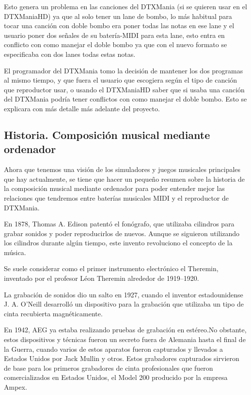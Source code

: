 \documentclass[a4paper,11pt,oneside]{book}
\begin{document}
Esto genera un problema en las canciones del DTXMania (si se quieren usar en el DTXManiaHD) ya que al solo tener un lane de bombo, lo más habitual para tocar una canción con doble bombo era poner todas las notas en ese lane y el usuario poner dos señales de su batería-MIDI para esta lane, esto entra en conflicto con como manejar el doble bombo ya que con el nuevo formato se especificaba con dos lanes todas estas notas.

El programador del DTXMania tomo la decisión de mantener los dos programas al mismo tiempo, y que fuera el usuario que escogiera según el tipo de canción que reproductor usar, o usando el DTXManiaHD saber que si usaba una canción del DTXMania podría tener conflictos con como manejar el doble bombo. Esto se explicara con más detalle más adelante del proyecto.

\subsection{Historia. Composición musical mediante ordenador}
Ahora que tenemos una visión de los simuladores y juegos musicales principales que hay actualmente, se tiene que hacer un pequeño resumen sobre la historia de la composición musical mediante ordenador para poder entender mejor las relaciones que tendremos entre baterías musicales MIDI y el reproductor de DTXMania.

En 1878, Thomas A. Edison patentó el fonógrafo, que utilizaba cilindros para grabar sonidos y poder reproducirlos de nuevos. Aunque se siguieron utilizando los cilindros durante algún tiempo, este invento revoluciono el concepto de la música.

Se suele considerar como el primer instrumento electrónico el Theremin, inventado por el profesor Léon Theremin alrededor de 1919–1920.

La grabación de sonidos dio un salto en 1927, cuando el inventor estadounidense J. A. O'Neill desarrolló un dispositivo para la grabación que utilizaba un tipo de cinta recubierta magnéticamente.

En 1942, AEG ya estaba realizando pruebas de grabación en estéreo.No obstante, estos dispositivos y técnicas fueron un secreto fuera de Alemania hasta el final de la Guerra, cuando varios de estos aparatos fueron capturados y llevados a Estados Unidos por Jack Mullin y otros. Estos grabadores capturados sirvieron de base para los primeros grabadores de cinta profesionales que fueron comercializados en Estados Unidos, el Model 200 producido por la empresa Ampex.
\end{document}
